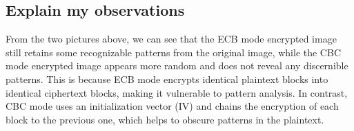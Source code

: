 \documentclass{article}
\begin{document}
\subsection{Explain my observations}
From the two pictures above, we can see that the ECB mode encrypted image still retains some recognizable patterns from the original image, while the CBC mode encrypted image appears more random and does not reveal any discernible patterns. This is because ECB mode encrypts identical plaintext blocks into identical ciphertext blocks, making it vulnerable to pattern analysis. In contrast, CBC mode uses an initialization vector (IV) and chains the encryption of each block to the previous one, which helps to obscure patterns in the plaintext.
\end{document}
